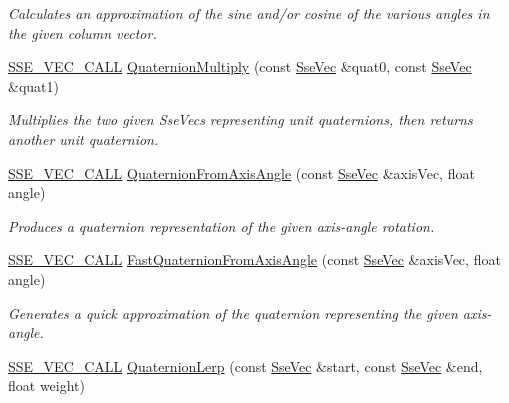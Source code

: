 \begin{DoxyCompactItemize}
\begin{DoxyCompactList}\small\item\em Calculates an approximation of the sine and/or cosine of the various angles in the given column vector. \end{DoxyCompactList}\item 
\hyperlink{ssevec__math__defs_8h_a97454f977a5281455cecacce1e8ba670}{S\+S\+E\+\_\+\+V\+E\+C\+\_\+\+C\+A\+L\+L} \hyperlink{group___s_i_m_d_vec_math_gaa6fdbae86d44a0c331da729efdc625e8}{Quaternion\+Multiply} (const \hyperlink{namespacegfxmath_a0de2243e2b8d0fd46d3af5e036423004}{Sse\+Vec} \&quat0, const \hyperlink{namespacegfxmath_a0de2243e2b8d0fd46d3af5e036423004}{Sse\+Vec} \&quat1)
\begin{DoxyCompactList}\small\item\em Multiplies the two given Sse\+Vecs representing unit quaternions, then returns another unit quaternion. \end{DoxyCompactList}\item 
\hyperlink{ssevec__math__defs_8h_a97454f977a5281455cecacce1e8ba670}{S\+S\+E\+\_\+\+V\+E\+C\+\_\+\+C\+A\+L\+L} \hyperlink{group___s_i_m_d_vec_math_ga1496fba93f6fadfbcc4b55c32c24df1a}{Quaternion\+From\+Axis\+Angle} (const \hyperlink{namespacegfxmath_a0de2243e2b8d0fd46d3af5e036423004}{Sse\+Vec} \&axis\+Vec, float angle)
\begin{DoxyCompactList}\small\item\em Produces a quaternion representation of the given axis-\/angle rotation. \end{DoxyCompactList}\item 
\hyperlink{ssevec__math__defs_8h_a97454f977a5281455cecacce1e8ba670}{S\+S\+E\+\_\+\+V\+E\+C\+\_\+\+C\+A\+L\+L} \hyperlink{group___s_i_m_d_vec_math_ga7dc1807a176952cfbccf2065f5c7e455}{Fast\+Quaternion\+From\+Axis\+Angle} (const \hyperlink{namespacegfxmath_a0de2243e2b8d0fd46d3af5e036423004}{Sse\+Vec} \&axis\+Vec, float angle)
\begin{DoxyCompactList}\small\item\em Generates a quick approximation of the quaternion representing the given axis-\/angle. \end{DoxyCompactList}\item 
\hyperlink{ssevec__math__defs_8h_a97454f977a5281455cecacce1e8ba670}{S\+S\+E\+\_\+\+V\+E\+C\+\_\+\+C\+A\+L\+L} \hyperlink{group___s_i_m_d_vec_math_ga019a858e63abf69d91b07797b1a90d6c}{Quaternion\+Lerp} (const \hyperlink{namespacegfxmath_a0de2243e2b8d0fd46d3af5e036423004}{Sse\+Vec} \&start, const \hyperlink{namespacegfxmath_a0de2243e2b8d0fd46d3af5e036423004}{Sse\+Vec} \&end, float weight)

\end{DoxyCompactItemize}
